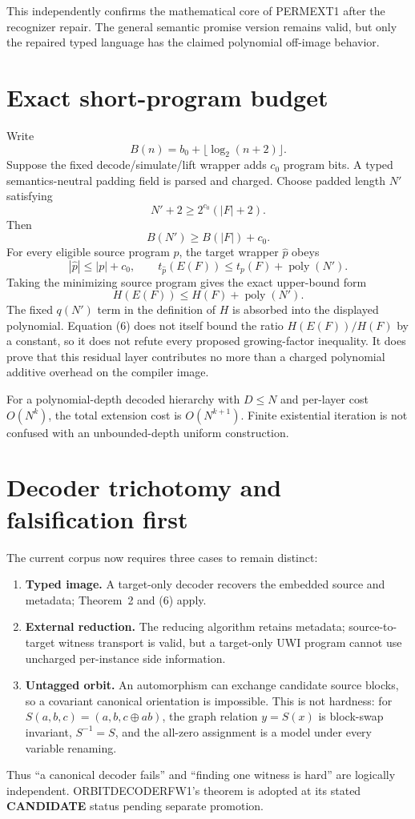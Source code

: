 \documentclass[11pt]{article}
\newcommand{\CAND}{\textbf{CANDIDATE}}
\begin{document}
This independently confirms the mathematical core of PERMEXT1 after the
recognizer repair.  The general semantic promise version remains valid, but
only the repaired typed language has the claimed polynomial off-image
behavior.

\section{Exact short-program budget}
Write
\[
 B(n)=b_0+\lfloor\log_2(n+2)\rfloor.
\]
Suppose the fixed decode/simulate/lift wrapper adds $c_0$ program bits.  A
typed semantics-neutral padding field is parsed and charged.  Choose padded
length $N'$ satisfying
\[
 N'+2\ge 2^{c_0}(|F|+2).                               \tag{3}
\]
Then
\[
 B(N')\ge B(|F|)+c_0.                                  \tag{4}
\]
For every eligible source program $p$, the target wrapper $\widehat p$ obeys
\[
 |\widehat p|\le|p|+c_0,\qquad
 t_{\widehat p}(E(F))\le t_p(F)+\operatorname{poly}(N').\tag{5}
\]
Taking the minimizing source program gives the exact upper-bound form
\[
 H(E(F))\le H(F)+\operatorname{poly}(N').               \tag{6}
\]
The fixed $q(N')$ term in the definition of $H$ is absorbed into the displayed
polynomial.  Equation (6) does not itself bound the ratio $H(E(F))/H(F)$ by a
constant, so it does not refute every proposed growing-factor inequality.  It
does prove that this residual layer contributes no more than a charged
polynomial additive overhead on the compiler image.

For a polynomial-depth decoded hierarchy with $D\le N$ and per-layer cost
$O(N^k)$, the total extension cost is $O(N^{k+1})$.  Finite existential
iteration is not confused with an unbounded-depth uniform construction.

\section{Decoder trichotomy and falsification first}
The current corpus now requires three cases to remain distinct:
\begin{enumerate}
\item \textbf{Typed image.}  A target-only decoder recovers the embedded source
and metadata; Theorem~2 and (6) apply.
\item \textbf{External reduction.}  The reducing algorithm retains metadata;
source-to-target witness transport is valid, but a target-only UWI program
cannot use uncharged per-instance side information.
\item \textbf{Untagged orbit.}  An automorphism can exchange candidate source
blocks, so a covariant canonical orientation is impossible.  This is not
hardness: for $S(a,b,c)=(a,b,c\oplus ab)$, the graph relation $y=S(x)$ is
block-swap invariant, $S^{-1}=S$, and the all-zero assignment is a model under
every variable renaming.
\end{enumerate}
Thus ``a canonical decoder fails'' and ``finding one witness is hard'' are
logically independent.  ORBITDECODERFW1's theorem is adopted at its stated
\CAND{} status pending separate promotion.
\end{document}
